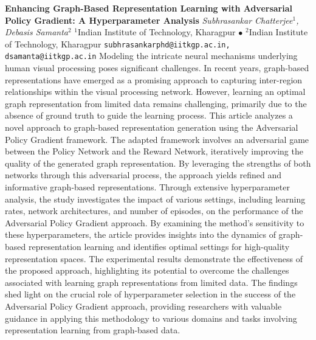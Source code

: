 
    \begin{conf-abstract}[]
        {\textbf{Enhancing Graph-Based Representation Learning with Adversarial Policy Gradient: A Hyperparameter Analysis}}
        {\textit{Subhrasankar Chatterjee$^{1}$, Debasis Samanta$^{2}$}}
        {$^{1}$Indian Institute of Technology, Kharagpur $\bullet$ $^{2}$Indian Institute of Technology, Kharagpur}
        {\texttt{subhrasankarphd@iitkgp.ac.in, dsamanta@iitkgp.ac.in}}
        {Modeling the intricate neural mechanisms underlying human visual processing poses significant challenges. In recent years, graph-based representations have emerged as a promising approach to capturing inter-region relationships within the visual processing network. However, learning an optimal graph representation from limited data remains challenging, primarily due to the absence of ground truth to guide the learning process. This article analyzes a novel approach to graph-based representation generation using the Adversarial Policy Gradient framework. The adapted framework involves an adversarial game between the Policy Network and the Reward Network, iteratively improving the quality of the generated graph representation. By leveraging the strengths of both networks through this adversarial process, the approach yields refined and informative graph-based representations. Through extensive hyperparameter analysis, the study investigates the impact of various settings, including learning rates, network architectures, and number of episodes, on the performance of the Adversarial Policy Gradient approach. By examining the method's sensitivity to these hyperparameters, the article provides insights into the dynamics of graph-based representation learning and identifies optimal settings for high-quality representation spaces. The experimental results demonstrate the effectiveness of the proposed approach, highlighting its potential to overcome the challenges associated with learning graph representations from limited data. The findings shed light on the crucial role of hyperparameter selection in the success of the Adversarial Policy Gradient approach, providing researchers with valuable guidance in applying this methodology to various domains and tasks involving representation learning from graph-based data.}
    \end{conf-abstract}
        